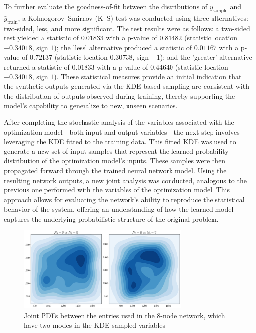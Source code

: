 To further evaluate the goodness-of-fit between the distributions of \( y_{\text{sample}} \) and \( \bar{y}_{\text{train}} \), a Kolmogorov–Smirnov (K–S) test was conducted using three alternatives: two-sided, less, and more significant. The test results were as follows: a two-sided test yielded a statistic of \( 0.01833 \) with a p-value of \( 0.81482 \) (statistic location \(-0.34018\), sign \(1\)); the 'less' alternative produced a statistic of \( 0.01167 \) with a p-value of \( 0.72137 \) (statistic location \(0.30738\), sign \(-1\)); and the 'greater' alternative returned a statistic of \( 0.01833 \) with a p-value of \( 0.44640 \) (statistic location \(-0.34018\), sign \(1\)). These statistical measures provide an initial indication that the synthetic outputs generated via the KDE-based sampling are consistent with the distribution of outputs observed during training, thereby supporting the model's capability to generalize to new, unseen scenarios.

After completing the stochastic analysis of the variables associated with the optimization model—both input and output variables—the next step involves leveraging the KDE fitted to the training data. This fitted KDE was used to generate a new set of input samples that represent the learned probability distribution of the optimization model's inputs. These samples were then propagated forward through the trained neural network model. Using the resulting network outputs, a new joint analysis was conducted, analogous to the previous one performed with the variables of the optimization model. This approach allows for evaluating the network's ability to reproduce the statistical behavior of the system, offering an understanding of how the learned model captures the underlying probabilistic structure of the original problem.



\begin{figure}
    \begin{center}
        \includegraphics[width=0.75\textwidth]{figures/Chapter_NonLinealCensnet/PDF_inputs_inputs (Sampled).png}
    \end{center}
    \caption{Joint PDFs between the entries used in the 8-node network, which have two modes in the KDE sampled variables}
    \label{fig:joint_distributions_input_input_KDE}
\end{figure}
     


